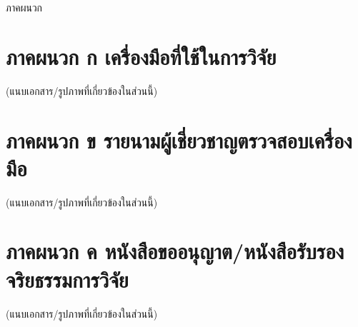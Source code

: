 \begin{center}
{\hOneSize ภาคผนวก}
\end{center}
\vspace{6pt}

\section*{ภาคผนวก ก  เครื่องมือที่ใช้ในการวิจัย}
(แนบเอกสาร/รูปภาพที่เกี่ยวข้องในส่วนนี้)

\section*{ภาคผนวก ข  รายนามผู้เชี่ยวชาญตรวจสอบเครื่องมือ}
(แนบเอกสาร/รูปภาพที่เกี่ยวข้องในส่วนนี้)

\section*{ภาคผนวก ค  หนังสือขออนุญาต/หนังสือรับรองจริยธรรมการวิจัย}
(แนบเอกสาร/รูปภาพที่เกี่ยวข้องในส่วนนี้)
